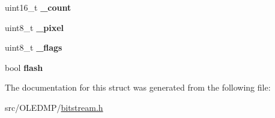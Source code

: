 \begin{DoxyCompactItemize}
\item 
\hypertarget{structbitstream__t_af818e6e9d7218107aa8fcf4e054c5a10}{uint16\+\_\+t {\bfseries \+\_\+count}}\label{structbitstream__t_af818e6e9d7218107aa8fcf4e054c5a10}

\item 
\hypertarget{structbitstream__t_a10c4ba029fe86182aa5dff53d2486072}{uint8\+\_\+t {\bfseries \+\_\+pixel}}\label{structbitstream__t_a10c4ba029fe86182aa5dff53d2486072}

\item 
\hypertarget{structbitstream__t_a5629227e4392e5086f50519e78e4c973}{uint8\+\_\+t {\bfseries \+\_\+flags}}\label{structbitstream__t_a5629227e4392e5086f50519e78e4c973}

\item 
\hypertarget{structbitstream__t_a5a483d65b3bc3c34154e6b31c07e4aa9}{bool {\bfseries flash}}\label{structbitstream__t_a5a483d65b3bc3c34154e6b31c07e4aa9}

\end{DoxyCompactItemize}


The documentation for this struct was generated from the following file\+:\begin{DoxyCompactItemize}
\item 
src/\+O\+L\+E\+D\+M\+P/\hyperlink{bitstream_8h}{bitstream.\+h}\end{DoxyCompactItemize}
